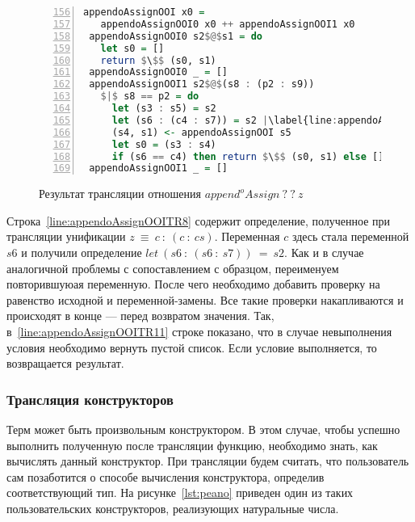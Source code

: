 \begin{figure}[h!]
  \begin{center}
  \begin{minipage}{\textwidth}
  \begin{lstlisting}[language=Haskell, frame=single, numbers=left,numberstyle=\small, firstnumber=156, escapechar=|]
 appendoAssignOOI x0 =
   appendoAssignOOI0 x0 ++ appendoAssignOOI1 x0
 appendoAssignOOI0 s2$@$s1 = do
   let s0 = []
   return $\$$ (s0, s1)
 appendoAssignOOI0 _ = []
 appendoAssignOOI1 s2$@$(s8 : (p2 : s9))
   $|$ s8 == p2 = do
     let (s3 : s5) = s2
     let (s6 : (c4 : s7)) = s2 |\label{line:appendoAssignOOITR8}|
     (s4, s1) <- appendoAssignOOI s5
     let s0 = (s3 : s4)
     if (s6 == c4) then return $\$$ (s0, s1) else [] |\label{line:appendoAssignOOITR11}|
 appendoAssignOOI1 _ = []
    \end{lstlisting}
  \end{minipage}
  \end{center}
  \caption{Результат трансляции отношения $append^oAssign \ ? \ ? \ z$}
  \label{lst:appendoAssignOOITR}
\end{figure}

Строка~\ref{line:appendoAssignOOITR8} содержит определение, полученное при трансляции унификации $z~\equiv~c~:~(c~:~cs)$.
Переменная $c$ здесь стала переменной $s6$ и получили определение $let~(s6~:~(s6~:~s7))~=~s2$.
Как и в случае аналогичной проблемы с сопоставлением с образцом, переименуем повторившуюая переменную.
После чего необходимо добавить проверку на равенство исходной и переменной-замены.
Все такие проверки накапливаются и происходят в конце --- перед возвратом значения.
Так, в~\ref{line:appendoAssignOOITR11} строке показано, что в случае невыполнения условия необходимо вернуть пустой список.
Если условие выполняется, то возвращается результат.


\subsubsection{Трансляция конструкторов}

Терм \miniKanren{} может быть произвольным конструктором.
В этом случае, чтобы успешно выполнить полученную после трансляции функцию, необходимо знать, как вычислять данный конструктор.
При трансляции будем считать, что пользователь сам позаботится о способе вычисления конструктора, определив соответствующий тип.
На рисунке~\ref{lst:peano} приведен один из таких пользовательских конструкторов, реализующих натуральные числа.

